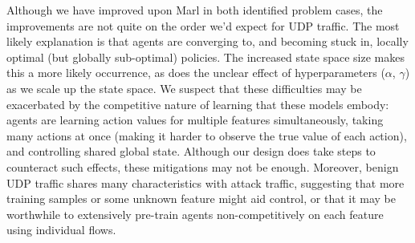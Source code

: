\documentclass[10pt, times, comsoc]{IEEEtran}
\begin{document}
Although we have improved upon Marl in both identified problem cases, the improvements are not quite on the order we'd expect for UDP traffic.
The most likely explanation is that agents are converging to, and becoming stuck in, locally optimal (but globally sub-optimal) policies.
The increased state space size makes this a more likely occurrence, as does the unclear effect of hyperparameters ($\alpha$, $\gamma$) as we scale up the state space.
We suspect that these difficulties may be exacerbated by the competitive nature of learning that these models embody: agents are learning action values for multiple features simultaneously, taking many actions at once (making it harder to observe the true value of each action), and controlling shared global state.
Although our design does take steps to counteract such effects, these mitigations may not be enough.
Moreover, benign UDP traffic shares many characteristics with attack traffic, suggesting that more training samples or some unknown feature might aid control, or that it may be worthwhile to extensively pre-train agents non-competitively on each feature using individual flows.

\end{document}
